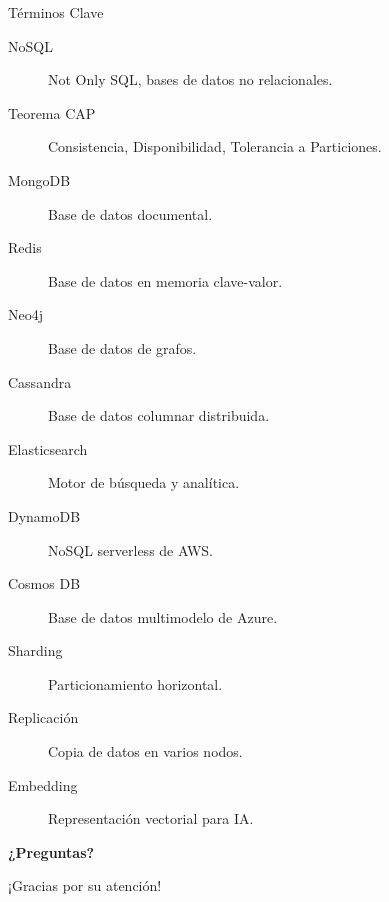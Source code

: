 \documentclass[aspectratio=169, 10pt, xcolor=table]{beamer}
\begin{document}
\begin{frame}{Términos Clave}
    \begin{description}
        \item[NoSQL] Not Only SQL, bases de datos no relacionales.
        \item[Teorema CAP] Consistencia, Disponibilidad, Tolerancia a Particiones.
        \item[MongoDB] Base de datos documental.
        \item[Redis] Base de datos en memoria clave-valor.
        \item[Neo4j] Base de datos de grafos.
        \item[Cassandra] Base de datos columnar distribuida.
        \item[Elasticsearch] Motor de búsqueda y analítica.
        \item[DynamoDB] NoSQL serverless de AWS.
        \item[Cosmos DB] Base de datos multimodelo de Azure.
        \item[Sharding] Particionamiento horizontal.
        \item[Replicación] Copia de datos en varios nodos.
        \item[Embedding] Representación vectorial para IA.
    \end{description}
\end{frame}

\begin{frame}
    \centering
    \Huge \textbf{¿Preguntas?}
    
    \vspace{1cm}
    \large ¡Gracias por su atención!
\end{frame}
\end{document}
